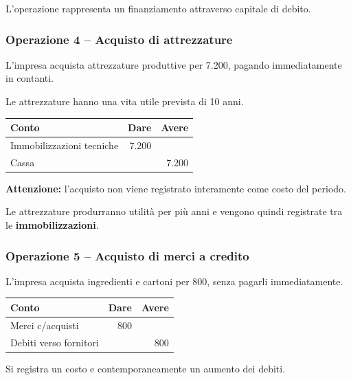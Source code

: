 \noindent L'operazione rappresenta
un finanziamento attraverso capitale di debito.


\subsubsection*{Operazione 4 -- Acquisto di attrezzature}

\noindent L'impresa acquista attrezzature produttive
per 7.200, pagando immediatamente in contanti.

\medskip

\noindent Le attrezzature hanno una vita utile
prevista di 10 anni.

\begin{center}
\begin{tabular}{|l|r|r|}
\hline
\textbf{Conto} & \textbf{Dare} & \textbf{Avere} \\
\hline
Immobilizzazioni tecniche & 7.200 & \\
\hline
Cassa & & 7.200 \\
\hline
\end{tabular}
\end{center}

\noindent \textbf{Attenzione:} l'acquisto
non viene registrato interamente
come costo del periodo.

\medskip

\noindent Le attrezzature produrranno utilità
per più anni e vengono quindi registrate
tra le \textbf{immobilizzazioni}.


\subsubsection*{Operazione 5 -- Acquisto di merci a credito}

\noindent L'impresa acquista ingredienti
e cartoni per 800, senza pagarli immediatamente.

\begin{center}
\begin{tabular}{|l|r|r|}
\hline
\textbf{Conto} & \textbf{Dare} & \textbf{Avere} \\
\hline
Merci c/acquisti & 800 & \\
\hline
Debiti verso fornitori & & 800 \\
\hline
\end{tabular}
\end{center}

\noindent Si registra un costo
e contemporaneamente un aumento dei debiti.


